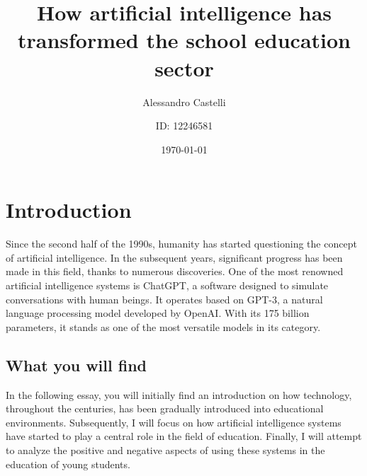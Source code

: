 \documentclass[a4paper,12pt]{article}
\title{How artificial intelligence has transformed the school education sector}
\author{Alessandro Castelli \and ID: 12246581}
\date{\today}
\begin{document}

\maketitle  %
\thispagestyle{empty}   %
\pagebreak  %

\cftsetpnumwidth{0.5cm} %
\renewcommand{\cftsecdotsep}{4} %
\tableofcontents    %


\setcounter{page}{1}    %
\newpage    %

\section{Introduction}  %
Since the second half of the 1990s, humanity has started questioning the concept of artificial intelligence. In the subsequent years, significant progress has been made in this field, thanks to numerous discoveries. One of the most renowned artificial intelligence systems is ChatGPT, a software designed to simulate conversations with human beings. It operates based on GPT-3, a natural language processing model developed by OpenAI. With its 175 billion parameters, it stands as one of the most versatile models in its category.

\begin{comment}
Fin dalla seconda metà degli anni 90 del secolo precedente l'umanità ha inziato ad interrogarsi sul concetto di intelligenza artificiale.Negli anni seguenti grazie alle innumerevoli scoperte in quel campo sono stati fatti grandi progressi.\\Uno dei sistemi di intelligenza artificale più famosi è ChatGPT, un software progettato per simulare una conversazione con un essere umano. Il suo funzionamento si basa su GPT-3, un modello di elaborazione del linguaggio naturale sviluppato da OpenAI. I suoi 175 miliardi di parametri lo rendono uno dei modelli più versatili della categoria.
\end{comment}

\subsection{What you will find}
In the following essay, you will initially find an introduction on how technology, throughout the centuries, has been gradually introduced into educational environments. Subsequently, I will focus on how artificial intelligence systems have started to play a central role in the field of education. Finally, I will attempt to analyze the positive and negative aspects of using these systems in the education of young students.
\end{document}
